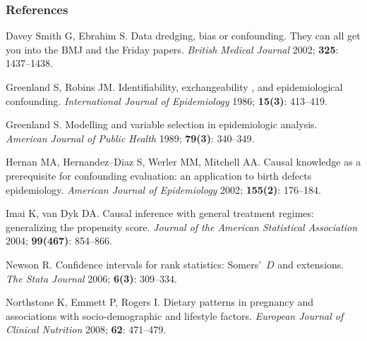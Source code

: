 \documentclass[11pt]{beamer}
\begin{document}
\begin{frame}
\frametitle{References}


{\scriptsize

\begin{thebibliography}{10}

Davey Smith G, Ebrahim S.
Data dredging, bias or confounding. They can all get you into the BMJ and the Friday papers.
\textsl{British Medical Journal} 2002; \textbf{325}: 1437--1438.

Greenland S, Robins JM.
Identifiability, exchangeability , and epidemiological confounding.
\textsl{International Journal of Epidemiology} 1986; \textbf{15(3)}: 413--419.

Greenland S.
Modelling and variable selection in epidemiologic analysis.
\textsl{American Journal of Public Health} 1989; \textbf{79(3)}: 340--349.

Hernan MA, Hernandez--Diaz S, Werler MM, Mitchell AA.
Causal knowledge as a prerequisite for confounding evaluation:
an application to birth defects epidemiology.
\textsl{American Journal of Epidemiology} 2002; \textbf{155(2)}: 176--184.

Imai K, van Dyk DA.
Causal inference with general treatment regimes: generalizing the propensity score.
\textsl{Journal of the American Statistical Association} 2004; \textbf{99(467)}: 854--866.

Newson R.
Confidence intervals for rank statistics: Somers'~$D$ and extensions.
\textsl{The Stata Journal} 2006; \textbf{6(3)}: 309--334.

Northstone K, Emmett P, Rogers I.
Dietary patterns in pregnancy and associations with socio-demographic and lifestyle factors.
\textsl{European Journal of Clinical Nutrition} 2008; \textbf{62}: 471--479.

\end{thebibliography}

}

\bigskip

\end{frame}
\end{document}
